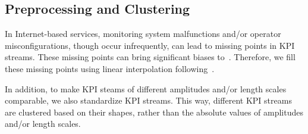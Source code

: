 \subsection{Preprocessing and Clustering}
\label{subsubsec:preprocessing}
In Internet-based services, monitoring system malfunctions and/or operator misconfigurations, though occur infrequently, can lead to missing points in KPI streams.
These missing points can bring significant biases to~\name.
Therefore, we fill these missing points using linear interpolation following~\cite{lirobust}. 

In addition, to make KPI steams of different amplitudes and/or length scales comparable, we also standardize KPI streams.
This way, different KPI streams are clustered based on their shapes, rather than the absolute values of amplitudes and/or length scales.



